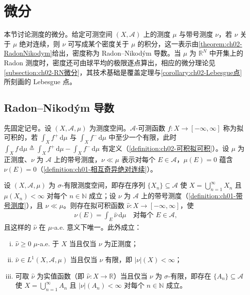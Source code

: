 \documentclass[../../main.tex]{subfiles}%
\begin{document}
\section{微分}\label{section:ch02-微分}

本节讨论测度的微分。给定可测空间 $(X,\mathscr A)$ 上的测度 $\mu$ 与带号测度 $\nu$，若 $\nu$ 关于 $\mu$ 绝对连续，则 $\nu$ 可写成某个密度关于 $\mu$ 的积分，这一表示由\cref{theorem:ch02-RadonNikodym}给出，密度称为 Radon--Nikodým 导数。当 $\mu$ 为 $\mathbb R^N$ 中开集上的 Radon 测度时，密度还可由球平均的极限逐点算出，相应的微分理论见\cref{subsection:ch02-RN微分}，其技术基础是覆盖定理与\cref{corollary:ch02-Lebesgue点}所刻画的 Lebesgue 点。

\subsection{Radon--Nikodým 导数}\label{subsection:ch02-RadonNikodym}

先固定记号。设 $(X,\mathscr A,\mu)$ 为测度空间。$\mathscr A$-可测函数 $f:X\to[-\infty,\infty]$ 称为拟可积的，若 $\int_Xf^+\,\mathrm{d}\mu$ 与 $\int_Xf^-\,\mathrm{d}\mu$ 中至少一个有限，此时 $\int_Xf\,\mathrm{d}\mu\triangleq\int_Xf^+\,\mathrm{d}\mu-\int_Xf^-\,\mathrm{d}\mu$ 有定义（\cref{definition:ch02-可积拟可积}）。设 $\mu$ 为正测度、$\nu$ 为 $\mathscr A$ 上的带号测度，$\nu\ll\mu$ 表示对每个 $E\in\mathscr A$，$\mu(E)=0$ 蕴含 $\nu(E)=0$（\cref{definition:ch01-相互奇异绝对连续}）。

\begin{theorem}\label{theorem:ch02-RadonNikodym}
设 $(X,\mathscr A,\mu)$ 为 $\sigma$-有限测度空间，即存在序列 $\{X_n\}\subseteq\mathscr A$ 使 $X=\bigcup_{n=1}^\infty X_n$ 且 $\mu(X_n)<\infty$ 对每个 $n\in\mathbb N$ 成立；设 $\nu$ 为 $\mathscr A$ 上的带号测度（\cref{definition:ch01-带号测度}），且 $\nu\ll\mu$。则存在拟可积函数 $\hat\nu:X\to[-\infty,\infty]$，使
\begin{align}
\nu(E)=\int_E\hat\nu\,\mathrm{d}\mu\quad\text{对每个 }E\in\mathscr A, \label{align:ch02-2.75}
\end{align}
且这样的 $\hat\nu$ 在 $\mu$-a.e. 意义下唯一。此外成立：
\begin{enumerate}[(i)]
\item $\hat\nu\geqslant0$ $\mu$-a.e. 于 $X$ 当且仅当 $\nu$ 为正测度；
\item $\hat\nu\in L^1(X,\mathscr A,\mu)$ 当且仅当 $\nu$ 有限，即 $|\nu|(X)<\infty$；
\item 可取 $\hat\nu$ 为实值函数（即 $\hat\nu:X\to\mathbb R$）当且仅当 $\nu$ 为 $\sigma$-有限，即存在 $\{A_n\}\subseteq\mathscr A$ 使 $X=\bigcup_{n=1}^\infty A_n$ 且 $|\nu|(A_n)<\infty$ 对每个 $n\in\mathbb N$ 成立。
\end{enumerate}
\end{theorem}
\end{document}
